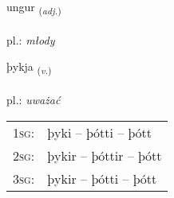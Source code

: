 \documentclass[frontgrid, backgrid]{flacards}\usepackage[]{graphicx}\usepackage[]{xcolor}
\begin{document}
\renewcommand{\blhead}{\vskip5pt {\small\bfseries\footnotesize Lýsingarorð | Adjective }}
\renewcommand{\bcfoot}{\vskip5pt \hspace{2pt}{\small\bfseries\footnotesize 1K}}


{ungur \small{\textsubscript{(\textit{adj.})}} \\[1ex] %
\textphonetic{[uŋkʏr]} \\
pl.: \emph{młody} \\  [2ex]
\renewcommand*{\arraystretch}{0.8}
}

\renewcommand{\flhead}{\vskip5pt \fboxsep=0pt {\small\bfseries\footnotesize Sagnorð | Verb}}
\renewcommand{\fcfoot}{\vskip5pt \fboxsep=0pt \hspace{2pt}{\small\bfseries\footnotesize 1K}}

\renewcommand{\blhead}{\vskip5pt {\small\bfseries\footnotesize Sagnorð | Verb }}
\renewcommand{\bcfoot}{\vskip5pt \hspace{2pt}{\small\bfseries\footnotesize 1K}}


{þykja \small{\textsubscript{(\textit{v.})}} \\[1ex] %
\textphonetic{[θɪːca]} \\
pl.: \emph{uważać} \\  [2ex]
\renewcommand*{\arraystretch}{0.8}
\begin{tabular}{p{1cm}l}
\textsc{1sg}: & þyki -- þótti -- þótt \\ 
\textsc{2sg}: & þykir -- þóttir -- þótt \\ 
\textsc{3sg}: & þykir -- þótti -- þótt \\ 
\end{tabular}
}
\end{document}
